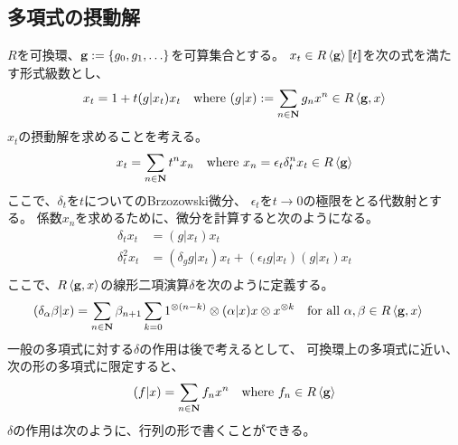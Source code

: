 {\subsection{多項式の摂動解}\label{s2:多項式の摂動解} %
	$R$を可換環、$\mathbf{g}:=\mathinner{\{{g_0,g_1,\dots}\}}$を可算集合とする。
	$x_t\in R\mathinner{\langle{\mathbf{g}}\rangle}\mathinner{[\![{t}]\!]}$を次の式を満たす形式級数とし、
	\begin{equation*}\begin{split}
		x_t = 1 + t(g|x_t)x_t \quad\text{where }
		(g|x) := \sum_{n\in\mathbf{N}} g_nx^n\in R\mathinner{\langle{\mathbf{g},x}\rangle}
	\end{split}\end{equation*}
	$x_t$の摂動解を求めることを考える。
	\begin{equation*}\begin{split}
		x_t = \sum_{n\in\mathbf{N}} t^nx_n
		\quad\text{where } x_n = \epsilon_t\delta_t^nx_t \in R\mathinner{\langle{\mathbf{g}}\rangle}
	\end{split}\end{equation*}
	ここで、$\delta_t$を$t$についてのBrzozowski微分、
	$\epsilon_t$を$t\to0$の極限をとる代数射とする。
	係数$x_n$を求めるために、微分を計算すると次のようになる。
	\begin{equation*}\begin{split}
		\delta_tx_t &= (g|x_t)x_t \\
		\delta_t^2x_t &= (\delta_g g|x_t)x_t + (\epsilon_t g|x_t)(g|x_t)x_t \\
	\end{split}\end{equation*}
	ここで、$R\mathinner{\langle{\mathbf{g},x}\rangle}$の線形二項演算$\delta$を次のように定義する。
	\begin{equation*}\begin{split}
		(\delta_\alpha\beta|x) &= \sum_{n\in\mathbf{N}} \beta_{n+1}\sum_{k=0}
		1^{\otimes(n-k)}\otimes (\alpha|x)x\otimes x^{\otimes k}
		\quad\text{for all } \alpha,\beta\in R\mathinner{\langle{\mathbf{g},x}\rangle}
	\end{split}\end{equation*}
	一般の多項式に対する$\delta$の作用は後で考えるとして、
	可換環上の多項式に近い、次の形の多項式に限定すると、
	\begin{equation*}\begin{split}
		(f|x) = \sum_{n\in\mathbf{N}} f_nx^n
		\quad\text{where } f_n\in R\mathinner{\langle{\mathbf{g}}\rangle}
	\end{split}\end{equation*}
	$\delta$の作用は次のように、行列の形で書くことができる。
	\begin{equation*}\begin{split}

\end{split}
\end{equation*}}
